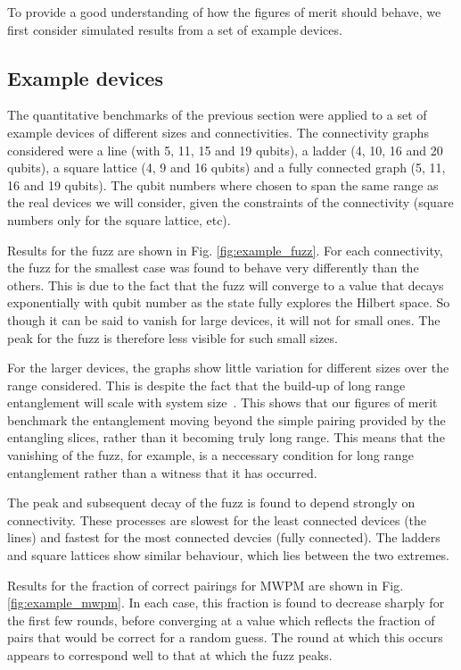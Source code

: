 \documentclass[aps,prl,twocolumn,showpacs,preprintnumbers]{revtex4-1}
\begin{document}
To provide a good understanding of how the figures of merit should behave, we first consider simulated results from a set of example devices.

\subsection{Example devices} \label{subsec:example}

The quantitative benchmarks of the previous section were applied to a set of example devices of different sizes and connectivities. The connectivity graphs considered were a line (with 5, 11, 15 and 19 qubits), a ladder (4, 10, 16 and 20 qubits), a square lattice (4, 9 and 16 qubits) and a fully connected graph (5, 11, 16 and 19 qubits). The qubit numbers where chosen to span the same range as the real devices we will consider, given the constraints of the connectivity (square numbers only for the square lattice, etc).


Results for the fuzz are shown in Fig. \ref{fig:example_fuzz}. For each connectivity, the fuzz for the smallest case was found to behave very differently than the others. This is due to the fact that the fuzz will converge to a value that decays exponentially with qubit number as the state fully explores the Hilbert space. So though it can be said to vanish for large devices, it will not for small ones. The peak for the fuzz is therefore less visible for such small sizes.

For the larger devices, the graphs show little variation for different sizes over the range considered. This is despite the fact that the build-up of long range entanglement will scale with system size~\cite{boixo:18}. This shows that our figures of merit benchmark the entanglement moving beyond the simple pairing provided by the entangling slices, rather than it becoming truly long range. This means that the vanishing of the fuzz, for example, is a neccessary condition for long range entanglement rather than a witness that it has occurred.

The peak and subsequent decay of the fuzz is found to depend strongly on connectivity. These processes are slowest for the least connected devices (the lines) and fastest for the most connected devcies (fully connected). The ladders and square lattices show similar behaviour, which lies between the two extremes.

Results for the fraction of correct pairings for MWPM are shown in Fig. \ref{fig:example_mwpm}. In each case, this fraction is found to decrease sharply for the first few rounds, before converging at a value which reflects the fraction of pairs that would be correct for a random guess. The round at which this occurs appears to correspond well to that at which the fuzz peaks.
\end{document}
